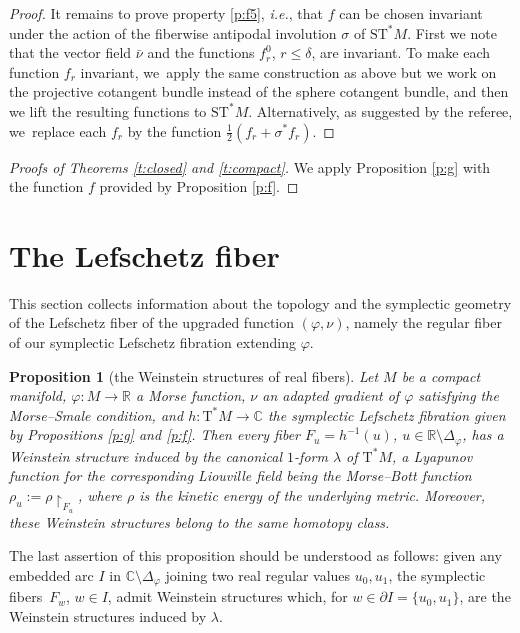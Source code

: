 \documentclass[10pt]{amsart}
\newcommand{\C}{{\mathbb C}}
\newcommand{\R}{{\mathbb R}}
\newcommand{\Discr}{\Delta_\varphi}
\newcommand{\tref}[1]{\textup{\ref{#1}}}
\newcommand{\sT}{\mathrm{T}^\ast}
\newcommand{\sST}{\mathrm{ST}^\ast}
\newcommand{\cnu}{\bar\nu}
\newcommand{\de}{\mathrel{:=}}
\newcommand{\rst}[1]{{\upharpoonright}_{\!#1}}
\let\del\partial
\let\on\colon
\theoremstyle{plain}
\newtheorem{proposition}[theorem]{Proposition}
\theoremstyle{definition}
\begin{document}
\begin{proof}
It remains to prove property \eqref{p:f5}, \emph{i.e.}, that $f$ can be chosen invariant
under the action of the fiberwise antipodal involution $\sigma$ of $\sST M$.
First we note that the vector field $\cnu$ and the functions $f^0_r$, $r \le
\delta$, are invariant. To make each function $f_r$ invariant, we~apply the same
construction as above but we work on the projective cotangent bundle instead of
the sphere cotangent bundle, and then we lift the resulting functions to $\sST
M$. Alternatively, as suggested by the referee, we~replace each $f_r$ by the
function $\tfrac12 (f_r + \sigma^*f_r)$.
\end{proof}

\begin{proof}[Proofs of Theorems \ref{t:closed} and \ref{t:compact}]
We apply Proposition \ref{p:g} with the function $f$ provided by Proposition
\ref{p:f}.
\end{proof}

\section{The Lefschetz fiber} \label{s:lf}

This section collects information about the topology and the symplectic geometry
of the Lefschetz fiber of the upgraded function $(\varphi,\nu)$, namely the
regular fiber of our symplectic Lefschetz fibration extending $\varphi$.

\begin{proposition}[the Weinstein structures of real fibers] \label{p:w}
Let $M$ be a compact manifold, $\varphi \on M \to \R$ a Morse function, $\nu$ an
adapted gradient of $\varphi$ satisfying the Morse--Smale condition, and $h \on
\sT M \to \C$ the symplectic Lefschetz fibration given by Propositions \tref{p:g}
and \tref{p:f}. Then every fiber $F_u = h^{-1}(u)$, $u \in \R \setminus \Discr$, has a
Weinstein structure induced by the canonical $1$-form $\lambda$ of $\sT M$, a
Lyapunov function for the corresponding Liouville field being the Morse--Bott
function $\rho_u \de \rho \rst{ F_u }$, where $\rho$ is the kinetic energy of
the underlying metric. Moreover, these Weinstein structures belong to the same
homotopy class.
\end{proposition}

The last assertion of this proposition should be understood as follows: given any
embedded arc $I$ in $\C \setminus \Discr$ joining two real regular values $u_0, u_1$,
the symplectic fibers~$F_w$, $w \in I$, admit Weinstein structures which, for
$w \in \del I = \{u_0,u_1\}$, are the Weinstein structures induced by $\lambda$.
\end{document}
